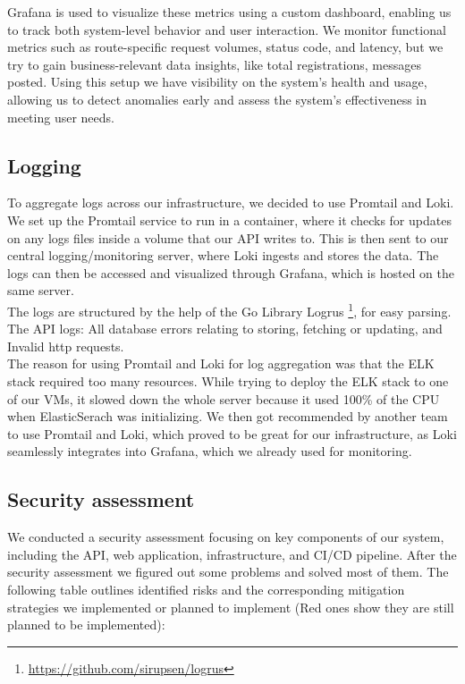 Grafana is used to visualize these metrics using a custom dashboard, enabling us to track both system-level behavior and user interaction. We monitor functional metrics such as route-specific request volumes, status code, and latency, but we try to gain business-relevant data insights, like total registrations, messages posted. Using this setup we have visibility on the system’s health and usage, allowing us to detect anomalies early and assess the system’s effectiveness in meeting user needs.

\subsection{Logging}
To aggregate logs across our infrastructure, we decided to use Promtail and Loki. We set up the Promtail service to run in a container, where it checks for updates on any logs files inside a volume that our API writes to. This is then sent to our central logging/monitoring server, where Loki ingests and stores the data. The logs can then be accessed and visualized through Grafana, which is hosted on the same server.
\\

The logs are structured by the help of the Go Library Logrus \footnote{\url{https://github.com/sirupsen/logrus}}, for easy parsing. The API logs: All database errors relating to storing, fetching or updating, and Invalid http requests.
\\

The reason for using Promtail and Loki for log aggregation was that the ELK stack required too many resources. While trying to deploy the ELK stack to one of our VMs, it slowed down the whole server because it used 100\% of the CPU when ElasticSerach was initializing. We then got recommended by another team to use Promtail and Loki, which proved to be great for our infrastructure, as Loki seamlessly integrates into Grafana, which we already used for monitoring.


\subsection{Security assessment}
We conducted a security assessment focusing on key components of our system, including the API, web application, infrastructure, and CI/CD pipeline. After the security assessment we figured out some problems and solved most of them. The following table outlines identified risks and the corresponding mitigation strategies we implemented or planned to implement (Red ones show they are still planned to be implemented):

